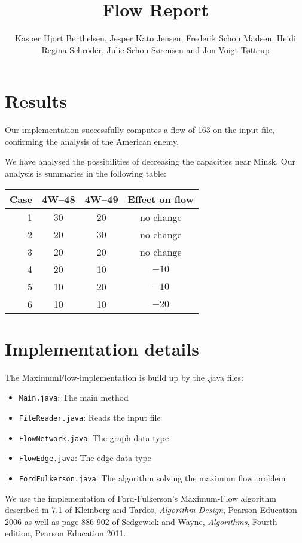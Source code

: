 \documentclass{tufte-handout}
\title{Flow Report}
\author{Kasper Hjort Berthelsen, Jesper Kato Jensen, Frederik Schou Madsen, Heidi Regina Schröder, Julie Schou Sørensen and Jon Voigt Tøttrup}
\begin{document}
  \maketitle

  \section{Results}

  Our implementation successfully computes a flow of 163 on the input file, confirming the analysis of the American enemy.

  We have analysed the possibilities of decreasing the capacities near Minsk.
  Our analysis is summaries in the following table:

\bigskip
  \begin{tabular}{rccc}\toprule
    Case & 4W--48 & 4W--49 & Effect on flow \\\midrule
    1& 30& 20 & no change \\
    2& 20 &30 & no change \\
    3&20 & 20& no change \\
    4& 20 & 10 & $-10$\\
    5& 10 & 20 & $-10$\\
    6& 10 & 10 & $-20$\\
    \bottomrule
  \end{tabular}
  \bigskip


\section{Implementation details}

The MaximumFlow-implementation is build up by the .java files:

\begin{itemize}[-]
\item \verb#Main.java#: The main method
\item \verb#FileReader.java#: Reads the input file
\item \verb#FlowNetwork.java#: The graph data type
\item \verb#FlowEdge.java#: The edge data type
\item \verb#FordFulkerson.java#: The algorithm solving the maximum flow problem
\end{itemize}


We use the implementation of Ford-Fulkerson's Maximum-Flow algorithm described in 7.1 of Kleinberg and Tardos, \emph{Algorithm Design}, Pearson Education 2006 as well as page 886-902 of Sedgewick and Wayne, \emph{Algorithms}, Fourth edition, Pearson Education 2011. 
\end{document}
